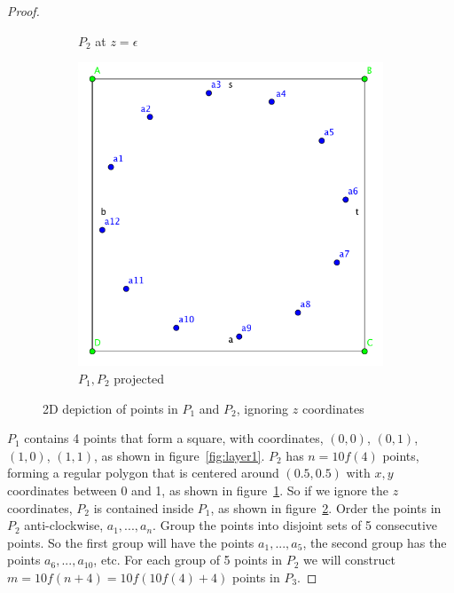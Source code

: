 \begin{proof}
\begin{figure}[!htb]
\begin{subfigure}[b]{.25\linewidth}
\caption{$P_2$ at $z = \epsilon$}\label{fig:layer2}
\end{subfigure}\hspace{10 mm}
\begin{subfigure}[b]{.25\linewidth}
\includegraphics[width=\linewidth]{layer1and2}
\caption{$P_1, P_2$ projected}\label{fig:layer1and2}
\end{subfigure}
\caption{2D depiction of points in $P_1$ and $P_2$, ignoring $z$ coordinates}
\label{fig:lower_bound_construction_overview}
\end{figure}

$P_1$ contains 4 points that form a square, with coordinates, $(0,0)$, $(0,1)$, $(1, 0)$, $(1, 1)$, as shown in figure~\ref{fig:layer1}. $P_2$ has $n = 10f(4)$ points, forming a regular polygon that is centered around $(0.5, 0.5)$ with $x, y$ coordinates between 0 and 1, as shown in figure~\ref{fig:layer2}. So if we ignore the $z$ coordinates, $P_2$ is contained inside $P_1$, as shown in figure~\ref{fig:layer1and2}. Order the points in $P_2$ anti-clockwise, $a_1, ..., a_n$. Group the points into disjoint sets of 5 consecutive points. So the first group will have the points $a_1, ..., a_5$, the second group has the points $a_6, ..., a_{10}$, etc. For each group of 5 points in $P_2$ we will construct $m = 10f(n+4) = 10f(10f(4) + 4)$ points in $P_3$.


\end{proof}
